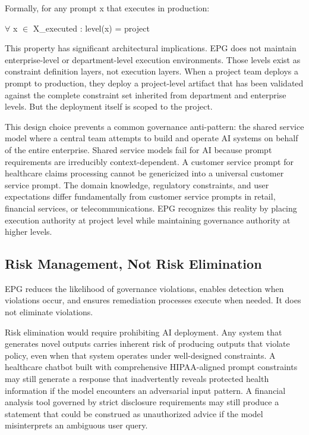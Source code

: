 Formally, for any prompt x that executes in production:

\begin{claddisp}
$\forall$ x $\in$ X\_executed : level(x) = project
\end{claddisp}


This property has significant architectural implications. EPG does not maintain enterprise-level or department-level execution environments. Those levels exist as constraint definition layers, not execution layers. When a project team deploys a prompt to production, they deploy a project-level artifact that has been validated against the complete constraint set inherited from department and enterprise levels. But the deployment itself is scoped to the project.

This design choice prevents a common governance anti-pattern: the shared service model where a central team attempts to build and operate AI systems on behalf of the entire enterprise. Shared service models fail for AI because prompt requirements are irreducibly context-dependent. A customer service prompt for healthcare claims processing cannot be genericized into a universal customer service prompt. The domain knowledge, regulatory constraints, and user expectations differ fundamentally from customer service prompts in retail, financial services, or telecommunications. EPG recognizes this reality by placing execution authority at project level while maintaining governance authority at higher levels.

\subsection{Risk Management, Not Risk Elimination}


EPG reduces the likelihood of governance violations, enables detection when violations occur, and ensures remediation processes execute when needed. It does not eliminate violations.

Risk elimination would require prohibiting AI deployment. Any system that generates novel outputs carries inherent risk of producing outputs that violate policy, even when that system operates under well-designed constraints. A healthcare chatbot built with comprehensive HIPAA-aligned prompt constraints may still generate a response that inadvertently reveals protected health information if the model encounters an adversarial input pattern. A financial analysis tool governed by strict disclosure requirements may still produce a statement that could be construed as unauthorized advice if the model misinterprets an ambiguous user query.


